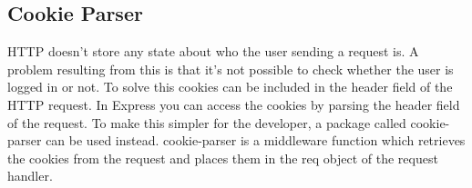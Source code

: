 \subsection{Cookie Parser}
HTTP doesn't store any state about who the user sending a request is. A problem resulting from this is that it's not possible to check whether the user is logged in or not. To solve this cookies can be included in the header field of the HTTP request. In Express you can access the cookies by parsing the header field of the request. To make this simpler for the developer, a package called cookie-parser can be used instead. cookie-parser is a middleware function which retrieves the cookies from the request and places them in the req object of the request handler. 